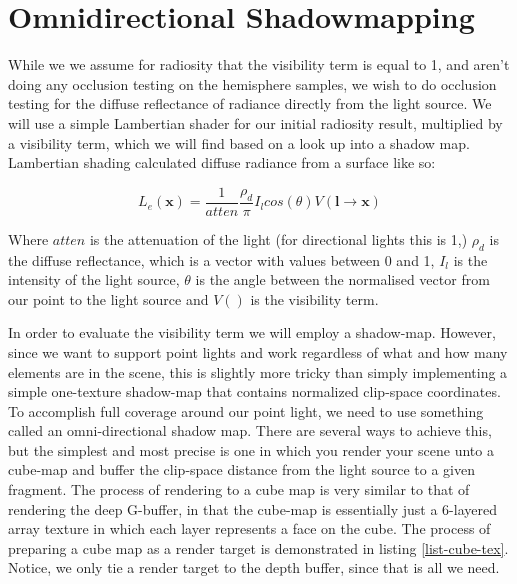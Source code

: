 \section{Omnidirectional Shadowmapping}
While we we assume for radiosity that the visibility term is equal to 1, and aren't doing any occlusion testing on the hemisphere samples, we wish to do occlusion testing for the diffuse reflectance of radiance directly from the light source. We will use a simple Lambertian shader for our initial radiosity result, multiplied by a visibility term, which we will find based on a look up into a shadow map. Lambertian shading calculated diffuse radiance from a surface like so:

$$L_e(\mathbf{x}) = \frac{1}{atten}\frac{\rho_d}{\pi} I_l cos(\theta) V(\mathbf{l} \rightarrow \mathbf{x})$$

Where $atten$ is the attenuation of the light (for directional lights this is 1,) $\rho_d$ is the diffuse reflectance, which is a vector with values between 0 and 1, $I_l$ is the intensity of the light source, $\theta$ is the angle between the normalised vector from our point to the light source and $V()$ is the visibility term.

In order to evaluate the visibility term we will employ a shadow-map. However, since we want to support point lights and work regardless of what and how many elements are in the scene, this is slightly more tricky than simply implementing a simple one-texture shadow-map that contains normalized clip-space coordinates. To accomplish full coverage around our point light, we need to use something called an omni-directional shadow map. There are several ways to achieve this, but the simplest and most precise is one in which you render your scene unto a cube-map and buffer the clip-space distance from the light source to a given fragment. The process of rendering to a cube map is very similar to that of rendering the deep G-buffer, in that the cube-map is essentially just a 6-layered array texture in which each layer represents a face on the cube. The process of preparing a cube map as a render target is demonstrated in listing \ref{list-cube-tex}. Notice, we only tie a render target to the depth buffer, since that is all we need.


